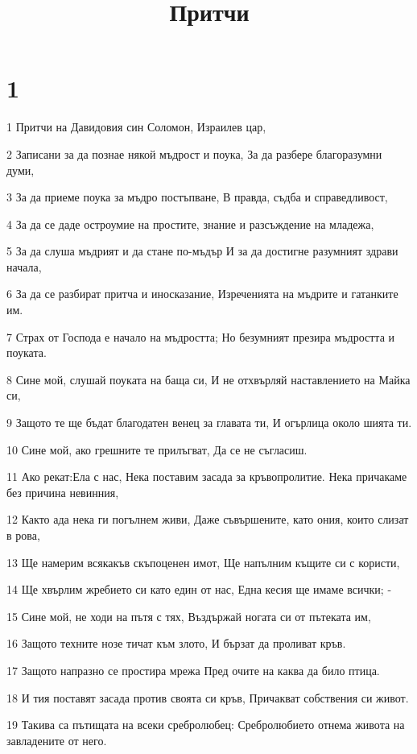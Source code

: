 

\title{Притчи}


\chapter{1}

\par 1 Притчи на Давидовия син Соломон, Израилев цар,
\par 2 Записани за да познае някой мъдрост и поука, За да разбере благоразумни думи,
\par 3 За да приеме поука за мъдро постъпване, В правда, съдба и справедливост,
\par 4 За да се даде остроумие на простите, знание и разсъждение на младежа,
\par 5 За да слуша мъдрият и да стане по-мъдър И за да достигне разумният здрави начала,
\par 6 За да се разбират притча и иносказание, Изреченията на мъдрите и гатанките им.
\par 7 Страх от Господа е начало на мъдростта; Но безумният презира мъдростта и поуката.
\par 8 Сине мой, слушай поуката на баща си, И не отхвърляй наставлението на Майка си,
\par 9 Защото те ще бъдат благодатен венец за главата ти, И огърлица около шията ти.
\par 10 Сине мой, ако грешните те прилъгват, Да се не съгласиш.
\par 11 Ако рекат:Ела с нас, Нека поставим засада за кръвопролитие. Нека причакаме без причина невинния,
\par 12 Както ада нека ги погълнем живи, Даже съвършените, като ония, които слизат в рова,
\par 13 Ще намерим всякакъв скъпоценен имот, Ще напълним къщите си с користи,
\par 14 Ще хвърлим жребието си като един от нас, Една кесия ще имаме всички; -
\par 15 Сине мой, не ходи на пътя с тях, Въздържай ногата си от пътеката им,
\par 16 Защото техните нозе тичат към злото, И бързат да проливат кръв.
\par 17 Защото напразно се простира мрежа Пред очите на каква да било птица.
\par 18 И тия поставят засада против своята си кръв, Причакват собствения си живот.
\par 19 Такива са пътищата на всеки сребролюбец: Сребролюбието отнема живота на завладените от него.
